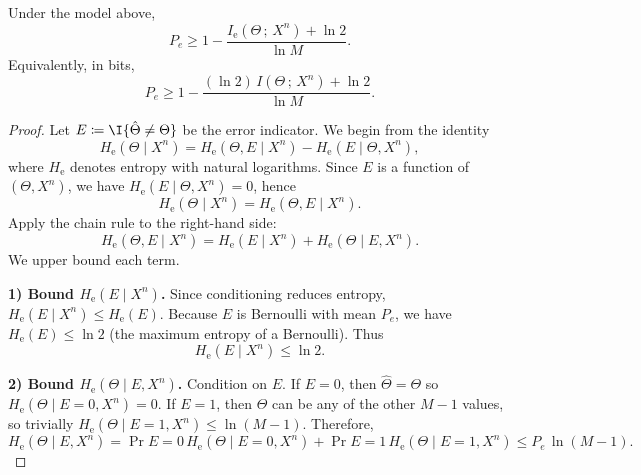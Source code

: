 \documentclass{article}
\numberwithin{equation}{section}
\newcommand{\MI}[2]{I\!\left(#1\,;\,#2\right)}
\newcommand{\MInat}[2]{I_{\mathrm{e}}\!\left(#1\,;\,#2\right)}
\begin{document}
\begin{theorem}
\label{thm:fano}
Under the model above,
\begin{equation}
\label{eq:fano}
    P_e \ge 1 - \frac{\MInat{\Theta}{X^n} + \ln 2}{\ln M}.
\end{equation}
Equivalently, in bits,
\begin{equation}
    P_e \ge 1 - \frac{(\ln 2)\,\MI{\Theta}{X^n} + \ln 2}{\ln M}.
\end{equation}
\end{theorem}
\begin{proof}
Let $E\coloneqq \I{\hat\Theta\neq \Theta}$ be the error indicator.
We begin from the identity
\begin{equation}
    H_{\mathrm{e}}(\Theta\mid X^n) = H_{\mathrm{e}}(\Theta,E\mid X^n) - H_{\mathrm{e}}(E\mid \Theta, X^n),
\end{equation}
where $H_{\mathrm{e}}$ denotes entropy with natural logarithms.
Since $E$ is a function of $(\Theta,X^n)$, we have $H_{\mathrm{e}}(E\mid \Theta,X^n)=0$, hence
\begin{equation}
\label{eq:fano-step1}
    H_{\mathrm{e}}(\Theta\mid X^n) = H_{\mathrm{e}}(\Theta,E\mid X^n).
\end{equation}
Apply the chain rule to the right-hand side:
\begin{equation}
\label{eq:fano-step2}
    H_{\mathrm{e}}(\Theta,E\mid X^n)
    = H_{\mathrm{e}}(E\mid X^n) + H_{\mathrm{e}}(\Theta\mid E, X^n).
\end{equation}
We upper bound each term.

\textbf{1) Bound $H_{\mathrm{e}}(E\mid X^n)$.}
Since conditioning reduces entropy, $H_{\mathrm{e}}(E\mid X^n)\le H_{\mathrm{e}}(E)$.
Because $E$ is Bernoulli with mean $P_e$, we have $H_{\mathrm{e}}(E)\le \ln 2$ (the maximum entropy of a Bernoulli).
Thus
\begin{equation}
\label{eq:fano-step3}
    H_{\mathrm{e}}(E\mid X^n) \le \ln 2.
\end{equation}

\textbf{2) Bound $H_{\mathrm{e}}(\Theta\mid E, X^n)$.}
Condition on $E$.
If $E=0$, then $\hat\Theta=\Theta$ so $H_{\mathrm{e}}(\Theta\mid E=0,X^n)=0$.
If $E=1$, then $\Theta$ can be any of the other $M-1$ values, so trivially
\(H_{\mathrm{e}}(\Theta\mid E=1,X^n)\le \ln(M-1)\).
Therefore,
\begin{equation}
\label{eq:fano-step4}
    H_{\mathrm{e}}(\Theta\mid E,X^n)
    = \Pr{E=0}\,H_{\mathrm{e}}(\Theta\mid E=0,X^n) + \Pr{E=1}\,H_{\mathrm{e}}(\Theta\mid E=1,X^n)
    \le P_e\,\ln(M-1).
\end{equation}


\end{proof}
\end{document}
